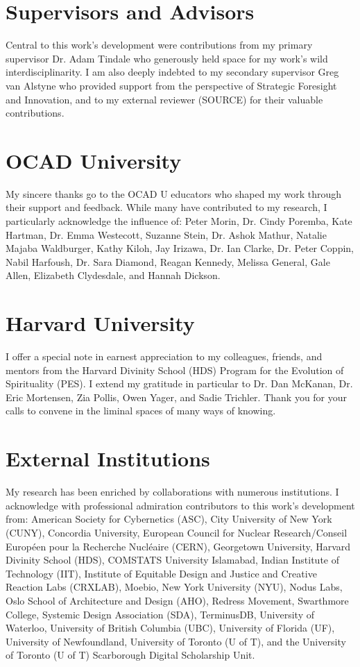 

\section*{Supervisors and Advisors}
Central to this work's development were contributions from my primary supervisor Dr. Adam Tindale who generously held space for my work’s wild interdisciplinarity.  I am also deeply indebted to my secondary supervisor Greg van Alstyne who provided support from the perspective of Strategic Foresight and Innovation, and to my external reviewer (SOURCE) for their valuable contributions.

\section*{OCAD University}
My sincere thanks go to the OCAD U educators who shaped my work through their support and feedback. While many have contributed to my research, I particularly acknowledge the influence of: Peter Morin, Dr. Cindy Poremba, Kate Hartman, Dr. Emma Westecott, Suzanne Stein, Dr. Ashok Mathur, Natalie Majaba Waldburger, Kathy Kiloh, Jay Irizawa, Dr. Ian Clarke, Dr. Peter Coppin, Nabil Harfoush, Dr. Sara Diamond, Reagan Kennedy, Melissa General, Gale Allen, Elizabeth Clydesdale, and Hannah Dickson.

\section*{Harvard University}
I offer a special note in earnest appreciation to my colleagues, friends, and mentors from the Harvard Divinity School (HDS) Program for the Evolution of Spirituality (PES). I extend my gratitude in particular to Dr. Dan McKanan, Dr. Eric Mortensen, Zia Pollis, Owen Yager, and Sadie Trichler. Thank you for your calls to convene in the liminal spaces of many ways of knowing.

\section*{External Institutions}
My research has been enriched by collaborations with numerous institutions. I acknowledge with professional admiration contributors to this work's development from: American Society for Cybernetics (ASC), City University of New York (CUNY), Concordia University, European Council for Nuclear Research/Conseil Européen pour la Recherche Nucléaire (CERN), Georgetown University, Harvard Divinity School (HDS), COMSTATS University Islamabad, Indian Institute of Technology (IIT), Institute of Equitable Design and Justice and Creative Reaction Labs (CRXLAB), Moebio, New York University (NYU), Nodus Labs, Oslo School of Architecture and Design (AHO), Redress Movement, Swarthmore College, Systemic Design Association (SDA), TerminusDB, University of Waterloo, University of British Columbia (UBC), University of Florida (UF), University of Newfoundland, University of Toronto (U of T), and the University of Toronto (U of T) Scarborough Digital Scholarship Unit. 

